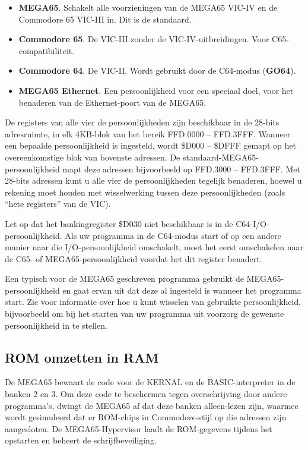 \begin{itemize}
\item {\bf MEGA65}. Schakelt alle voorzieningen van de MEGA65 VIC-IV en de Commodore 65 VIC-III in. Dit is de standaard.\item {\bf Commodore 65}. De VIC-III zonder de VIC-IV-uitbreidingen. Voor C65-compatibiliteit.\item {\bf Commodore 64}. De VIC-II. Wordt gebruikt door de C64-modus (\textbf{GO64}).\item {\bf MEGA65 Ethernet}. Een persoonlijkheid voor een speciaal doel, voor het benaderen van de Ethernet-poort van de MEGA65.
\end{itemize}

De registers van alle vier de persoonlijkheden zijn beschikbaar in de 28-bits adresruimte, in elk 4KB-blok van het bereik FFD.0000 -- FFD.3FFF. Wanneer een bepaalde persoonlijkheid is ingesteld, wordt \$D000 -- \$DFFF gemapt op het overeenkomstige blok van bovenste adressen. De standaard-MEGA65-persoonlijkheid mapt deze adressen bijvoorbeeld op FFD.3000 -- FFD.3FFF. Met 28-bits adressen kunt u alle vier de persoonlijkheden tegelijk benaderen, hoewel u rekening moet houden met wisselwerking tussen deze persoonlijkheden (zoals ``hete registers'' van de VIC).

Let op dat het bankingregister \$D030 niet beschikbaar is in de C64-I/O-persoonlijkheid. Als uw programma in de C64-modus start of op een andere manier naar die I/O-persoonlijkheid omschakelt, moet het eerst omschakelen naar de C65- of MEGA65-persoonlijkheid voordat het dit register benadert.

Een typisch voor de MEGA65 geschreven programma gebruikt de MEGA65-persoonlijkheid en gaat ervan uit dat deze al ingesteld is wanneer het programma start. Zie  voor informatie over hoe u kunt wisselen van gebruikte persoonlijkheid, bijvoorbeeld om bij het starten van uw programma uit voorzorg de gewenste persoonlijkheid in te stellen.

\subsection{ROM omzetten in RAM}

De MEGA65 bewaart de code voor de KERNAL en de BASIC-interpreter in de banken 2 en 3. Om deze code te beschermen tegen overschrijving door andere programma's, dwingt de MEGA65 af dat deze banken alleen-lezen zijn, waarmee wordt gesimuleerd dat er ROM-chips in Commodore-stijl op die adressen zijn aangesloten. De MEGA65-Hypervisor laadt de ROM-gegevens tijdens het opstarten en beheert de schrijfbeveiliging.

